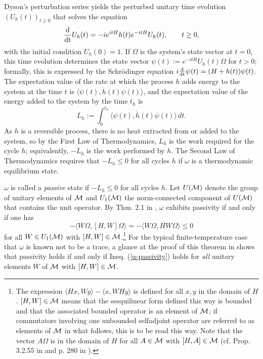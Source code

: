 \documentclass[a4paper,11pt]{article}
\def\dt{\cal}
\def\dM{{\dt M}}
\def\gO{\Omega}
\def\go{\omega}
\def\ddt{\frac{{\rm d}}{{\rm dt}}}
\begin{document}
Dyson's perturbation series yields the perturbed unitary time evolution
\newline $(U_h(t))_{t\geq0}$ that solves the equation
\begin{equation}\label{Dyson}
\ddt U_h(t)=-ie^{itH}h(t)e^{-itH}U_h(t),\qquad t\geq0,
\end{equation}
with the initial condition $U_h(0)=1$.
If $\gO$ is the system's state vector at $t=0$, this time
evolution determines the state vector $\psi(t):=e^{-itH}U_h(t)\gO$
for $t>0$;
formally, this is expressed by the Schr\"odinger equation
$i\ddt\psi(t)=(H+h(t))\psi(t)$. The expectation value of the
rate at which the process $h$ adds
energy to the system at the time $t$
is $\langle\psi(t),\dot{h}(t)\psi(t)\rangle$, and
the expectation value of the energy added
to the system by the time $t_h$ is
$$L_h:=\int_0^{t_h}\langle\psi(t),
\dot{h}(t)\psi(t)\rangle\,dt.$$
As $h$ is a reversible process,
there is no heat extracted from or added to the
system, so by the First Law of Thermodynamics,
$L_h$ is the work required for the cycle $h$;
equivalently, $-L_h$ is the work performed
by $h$. The Second Law of Thermodynamics requires that
$-L_h\leq0$ for all cycles $h$ if $\go$ is a
thermodynamic equilibrium state.

$\go$ is called a {\em passive} state if $-L_h\leq0$
for all cycles $h$. Let $U(\dM)$ denote the group of unitary
elements of $\dM$ and $U_1(\dM)$ the norm-connected component
of $U(\dM)$ that contains the unit operator.
By Thm. 2.1 in \cite{PW78},
$\go$ exhibits passivity if and only if one has
\begin{equation}\label{u-passivity}
-\langle W\gO,[H,W]\gO\rangle=-\langle W\gO,HW\gO\rangle\leq0
\end{equation}
for all $W\in U_1(\dM)$ with $[H,W]\in\dM$.\footnote{The
expression $\langle Hx,Wy\rangle-\langle x,WHy\rangle$
is defined for all $x,y$ in the domain of
$H$. $[H,W]\in\dM$ means that the sesquilinear form defined this way
is bounded and that the associated bounded operator is an element of
$\dM$; if commutators involving one unbounded selfadjoint operator are
referred to as elements of $\dM$ in what follows, this is to be
read this way. Note that the vector $A\gO$ is in the domain
of $H$ for all $A\in\dM$ with $[H,A]\in\dM$ (cf. Prop. 3.2.55
in \cite{BR1} and p. 280 in \cite{PW78}).}
For the typical finite-temperature case that
$\go$ is known not to be a trace, a glance at the proof of this
theorem in \cite{PW78} shows that
passivity holds if and only if Ineq. (\ref{u-passivity}) holds for
{\it all} unitary elements $W$ of $\dM$ with $[H,W]\in\dM$.
\end{document}
